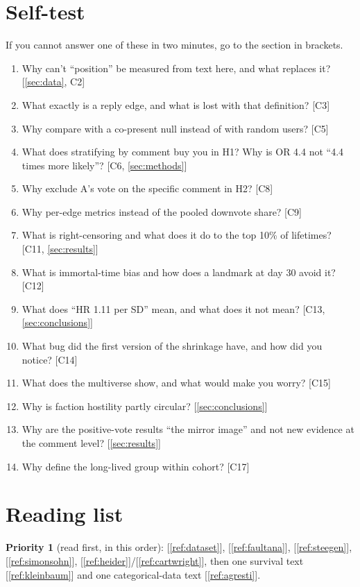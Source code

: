 \documentclass[11pt,a4paper]{article}
\begin{document}
\section{Self-test}\label{sec:selftest}
If you cannot answer one of these in two minutes, go to the section in brackets.
\begin{enumerate}
  \item Why can't ``position'' be measured from text here, and what replaces it? [\ref{sec:data}, C2]
  \item What exactly is a reply edge, and what is lost with that definition? [C3]
  \item Why compare with a co-present null instead of with random users? [C5]
  \item What does stratifying by comment buy you in H1? Why is OR 4.4 not ``4.4 times more likely''? [C6, \ref{sec:methods}]
  \item Why exclude A's vote on the specific comment in H2? [C8]
  \item Why per-edge metrics instead of the pooled downvote share? [C9]
  \item What is right-censoring and what does it do to the top 10\% of lifetimes? [C11, \ref{sec:results}]
  \item What is immortal-time bias and how does a landmark at day 30 avoid it? [C12]
  \item What does ``HR 1.11 per SD'' mean, and what does it not mean? [C13, \ref{sec:conclusions}]
  \item What bug did the first version of the shrinkage have, and how did you notice? [C14]
  \item What does the multiverse show, and what would make you worry? [C15]
  \item Why is faction hostility partly circular? [\ref{sec:conclusions}]
  \item Why are the positive-vote results ``the mirror image'' and not new evidence at the comment level? [\ref{sec:results}]
  \item Why define the long-lived group within cohort? [C17]
\end{enumerate}

\section{Reading list}\label{sec:reading}
\textbf{Priority 1} (read first, in this order): [\ref{ref:dataset}], [\ref{ref:faultana}], [\ref{ref:steegen}], [\ref{ref:simonsohn}], [\ref{ref:heider}]/[\ref{ref:cartwright}], then one survival text [\ref{ref:kleinbaum}] and one categorical-data text [\ref{ref:agresti}].
\end{document}
